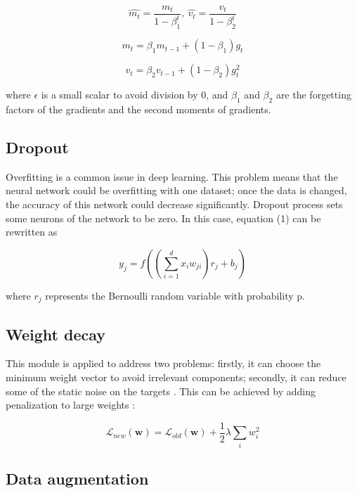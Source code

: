 \documentclass[twoside,twocolumn,10.8pt]{article}
\begin{document}
\begin{equation}
\label{eq:5}
\widehat{m_t}=\frac{m_t}{1-\beta_1^t},\ \widehat{v_t}=\frac{v_t}{1-\beta_2^t}
\end{equation}

\begin{equation}
\label{eq:6}
m_t=\beta_1m_{t-1}+(1-\beta_1)g_t
\end{equation}

\begin{equation}
\label{eq:7}
v_t=\beta_2v_{t-1}+(1-\beta_2)g_t^2
\end{equation}

\noindent where $\epsilon$ is a small scalar to avoid division by 0, and $\beta_1$ and $\beta_2$ are the forgetting factors of the gradients and the second moments of gradients. 

\subsection{Dropout}

Overfitting is a common issue in deep learning. This problem means that the neural network could be overfitting with one dataset; once the data is changed, the accuracy of this network could decrease significantly. Dropout process sets some neurons of the network to be zero. In this case, equation (1) can be rewritten as 

\begin{equation}
\label{eq:8}
y_j=f((\sum_{i=1}^{d}x_iw_{ji})r_j+b_j)
\end{equation}

\noindent where $r_j$ represents the Bernoulli random variable with probability p. \cite{R3}

\subsection{Weight decay}

This module is applied to address two problems: firstly, it can choose the minimum weight vector to avoid irrelevant components; secondly, it can reduce some of the static noise on the targets \cite{R4}. This can be achieved by adding penalization to large weights \cite{R3}:

\begin{equation}
\label{eq:9}
\mathcal{L}_{new}(\textbf{w})=\mathcal{L}_{old}(\textbf{w})+\frac{1}{2}\lambda\sum_{i}w_i^2
\end{equation}


\subsection{Data augmentation}
\end{document}

